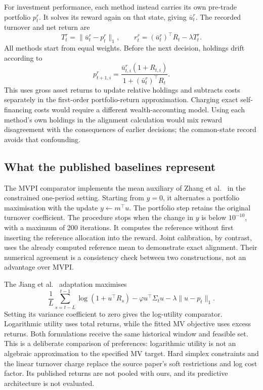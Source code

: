 \documentclass[sigconf,anonymous,review]{acmart}
\begin{document}
For investment performance, each method instead carries its own pre-trade portfolio $p_t^r$. It solves its reward again on that state, giving $\bar u_t^r$. The recorded turnover and net return are
\begin{equation}
 T_t^r=\|\bar u_t^r-p_t^r\|_1,\qquad
 r_t^r=(\bar u_t^r)^\top R_t-\lambda T_t^r.
\end{equation}
All methods start from equal weights. Before the next decision, holdings drift according to
\begin{equation}
 p_{t+1,i}^r=
 \frac{\bar u_{t,i}^r(1+R_{t,i})}{1+(\bar u_t^r)^\top R_t}.
\end{equation}
This uses gross asset returns to update relative holdings and subtracts costs separately in the first-order portfolio-return approximation. Charging exact self-financing costs would require a different wealth-accounting model. Using each method's own holdings in the alignment calculation would mix reward disagreement with the consequences of earlier decisions; the common-state record avoids that confounding.

\subsection{What the published baselines represent}
The MVPI comparator implements the mean auxiliary of Zhang et al.\ \cite{zhang2021} in the constrained one-period setting. Starting from $y=0$, it alternates a portfolio maximisation with the update $y\leftarrow m^\top u$. The portfolio step retains the original turnover coefficient. The procedure stops when the change in $y$ is below $10^{-10}$, with a maximum of 200 iterations. It computes the reference without first inserting the reference allocation into the reward. Joint calibration, by contrast, uses the already computed reference mean to demonstrate exact alignment. Their numerical agreement is a consistency check between two constructions, not an advantage over MVPI.

The Jiang et al.\ \cite{jiang2025} adaptation maximises
\begin{equation}
 \frac1L\sum_{s=t-L}^{t-1}\log(1+u^\top R_s)
 -\varphi u^\top\Sigma_tu-\lambda\|u-p_t\|_1.
\end{equation}
Setting its variance coefficient to zero gives the log-utility comparator. Logarithmic utility uses total returns, while the fitted MV objective uses excess returns. Both formulations receive the same historical window and feasible set. This is a deliberate comparison of preferences: logarithmic utility is not an algebraic approximation to the specified MV target. Hard simplex constraints and the linear turnover charge replace the source paper's soft restrictions and log cost factor. Its published returns are not pooled with ours, and its predictive architecture is not evaluated.
\end{document}
